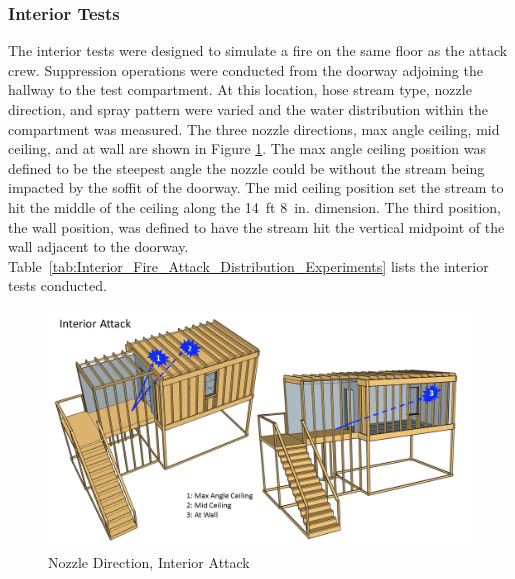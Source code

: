 \documentclass{article}
\begin{document}
\subsubsection{Interior Tests}
\label{int_tests}
The interior tests were designed to simulate a fire on the same floor as the attack crew. Suppression operations were conducted from the doorway adjoining the hallway to the test compartment. At this location, hose stream type, nozzle direction, and spray pattern were varied and the water distribution within the compartment was measured. The three nozzle directions, max angle ceiling, mid ceiling, and at wall are shown in Figure \ref{fig:Nozzle_Direction_Interior_Attack}. The max angle ceiling position was defined to be the steepest angle the nozzle could be without the stream being impacted by the soffit of the doorway. The mid ceiling position set the stream to hit the middle of the ceiling along the 14~ft 8~in. dimension. The third position, the wall position, was defined to have the stream hit the vertical midpoint of the wall adjacent to the doorway. Table~\ref{tab:Interior_Fire_Attack_Distribution_Experiments} lists the interior tests conducted.

\begin{figure}[!ht]
	\centering
	\includegraphics[width=\columnwidth]{Figures/Water_Distribution/Nozzle_Position_Int}
	\caption{Nozzle Direction, Interior Attack}
	\label{fig:Nozzle_Direction_Interior_Attack}
\end{figure}
\end{document}
